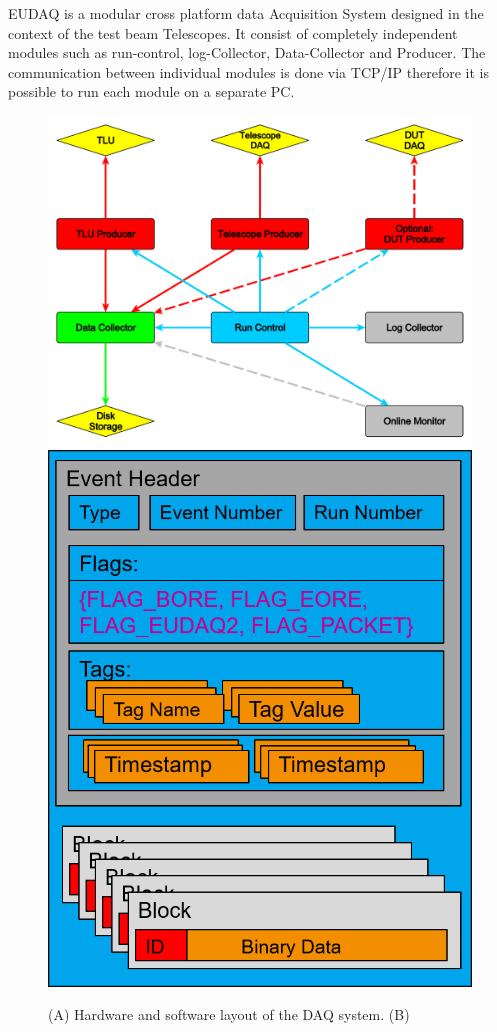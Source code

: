 
EUDAQ is a modular cross platform data Acquisition System designed in the context of the \eudet test beam Telescopes. 
It consist of completely independent modules such as run-control, log-Collector, Data-Collector and Producer. 
The communication between individual modules is done via TCP/IP therefore it is possible to run each module on a separate PC. 


\begin{figure}[tb]
	\center
	\includegraphics[width=.55\textwidth]{figures/eudaq}
	\includegraphics[width=.38\textwidth]{figures/rawdataevent.png}
	\caption[DAQ_System]{(A) Hardware and software layout of the DAQ system. (B) \rawdataevent}
	\label{fig:todo}
\end{figure}

% 	



